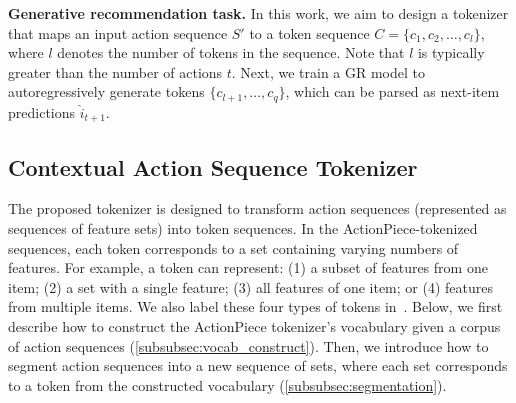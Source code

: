 \textbf{Generative recommendation task.} In this work, we aim to design a tokenizer that maps an input action sequence $S'$ to a token sequence $C = \{c_1, c_2, \ldots, c_l\}$, where $l$ denotes the number of tokens in the sequence. Note that $l$ is typically greater than the number of actions $t$. Next, we train a GR model to autoregressively generate tokens $\{c_{l+1}, \ldots, c_q\}$, which can be parsed as next-item predictions $\hat{i}_{t+1}$.

\subsection{Contextual Action Sequence Tokenizer}\label{subsec:tokenizer}

The proposed tokenizer is designed to transform action sequences (represented as sequences of feature sets) into token sequences. In the ActionPiece-tokenized sequences, each token corresponds to a set containing varying numbers of features. For example, a token can represent: (1) a subset of features from one item; (2) a set with a single feature; (3) all features of one item; or (4) features from multiple items.
We also label these four types of tokens in~.
Below, we first describe how to construct the ActionPiece tokenizer’s vocabulary given a corpus of action sequences (\cref{subsubsec:vocab_construct}). Then, we introduce how to segment action sequences into a new sequence of sets, where each set corresponds to a token from the constructed vocabulary (\cref{subsubsec:segmentation}).




